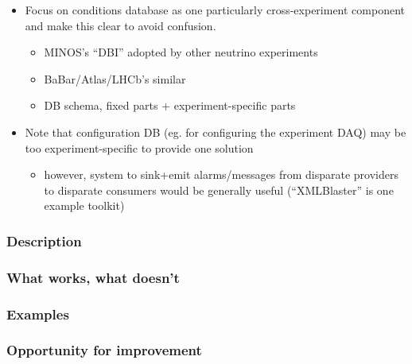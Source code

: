 \begin{itemize}
\item Focus on conditions database as one particularly cross-experiment component and make this clear to avoid confusion.
  \begin{itemize}
  \item MINOS's ``DBI'' adopted by other neutrino experiments
  \item BaBar/Atlas/LHCb's similar
  \item DB schema, fixed parts + experiment-specific parts
  \end{itemize}
\item Note that configuration DB (eg. for configuring the experiment DAQ) may be too experiment-specific to provide one solution
  \begin{itemize}
  \item however, system to sink+emit alarms/messages from disparate providers to disparate consumers would be generally useful (``XMLBlaster'' is one example toolkit)
  \end{itemize}
\end{itemize}

\subsubsection{Description}
\subsubsection{What works, what doesn't}
\subsubsection{Examples}
\subsubsection{Opportunity for improvement}
